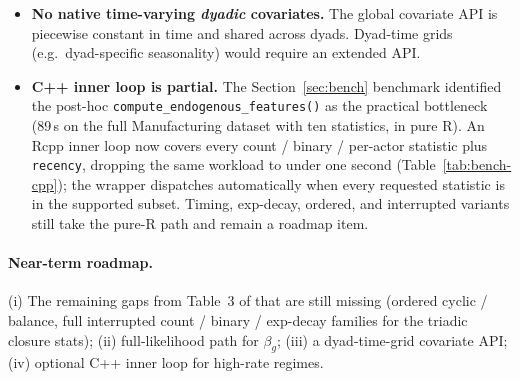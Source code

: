 \documentclass[11pt,a4paper]{article}
\begin{document}
\begin{itemize}
      gap empirically.
\item \textbf{No native time-varying \emph{dyadic} covariates.}
      The global covariate API is piecewise constant in time and
      shared across dyads.  Dyad-time grids (e.g.\ dyad-specific
      seasonality) would require an extended API.
\item \textbf{C++ inner loop is partial.}  The
      Section~\ref{sec:bench} benchmark identified the post-hoc
      \texttt{compute\_endogenous\_features()} as the practical
      bottleneck (89\,s on the full Manufacturing dataset with
      ten statistics, in pure R). An Rcpp inner loop now covers
      every count / binary / per-actor statistic plus
      \texttt{recency}, dropping the same workload to under one
      second (Table~\ref{tab:bench-cpp}); the wrapper dispatches
      automatically when every requested statistic is in the
      supported subset. Timing, exp-decay, ordered, and
      interrupted variants still take the pure-R path and remain
      a roadmap item.
\end{itemize}

\paragraph{Near-term roadmap.}
(i) The remaining gaps from Table~3 of
\citet{juozaitiene2024about} that are still missing (ordered
cyclic / balance, full interrupted count / binary / exp-decay
families for the triadic closure stats);
(ii) full-likelihood path for $\beta_g$;
(iii) a dyad-time-grid covariate API;
(iv) optional C++ inner loop for high-rate regimes.



\end{document}
